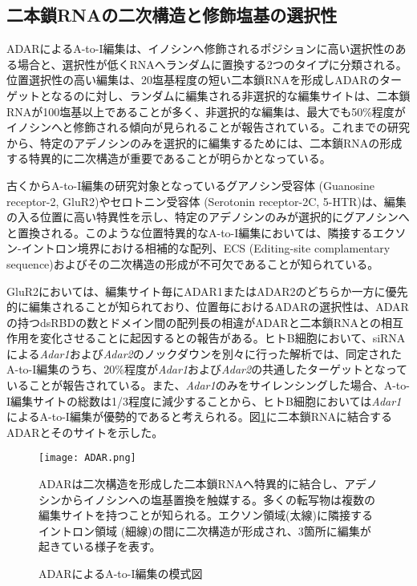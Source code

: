 \subsection{二本鎖RNAの二次構造と修飾塩基の選択性}
ADARによるA-to-I編集は、イノシンへ修飾されるポジションに高い選択性のある場合と、選択性が低くRNAへランダムに置換する2つのタイプに分類される。位置選択性の高い編集は、20塩基程度の短い二本鎖RNAを形成しADARのターゲットとなるのに対し、ランダムに編集される非選択的な編集サイトは、二本鎖RNAが100塩基以上であることが多く、非選択的な編集は、最大でも50\%程度がイノシンへと修飾される傾向が見られることが報告されている。これまでの研究から、特定のアデノシンのみを選択的に編集するためには、二本鎖RNAの形成する特異的に二次構造が重要であることが明らかとなっている。
\par
古くからA-to-I編集の研究対象となっているグアノシン受容体 (Guanosine receptor-2, GluR2)やセロトニン受容体 (Serotonin receptor-2C, 5-HTR)は、編集の入る位置に高い特異性を示し、特定のアデノシンのみが選択的にグアノシンへと置換される。このような位置特異的なA-to-I編集においては、隣接するエクソン-イントロン境界における相補的な配列、ECS (Editing-site complamentary sequence)およびその二次構造の形成が不可欠であることが知られている。
\par
GluR2においては、編集サイト毎にADAR1またはADAR2のどちらか一方に優先的に編集されることが知られており、位置毎におけるADARの選択性は、ADARの持つdsRBDの数とドメイン間の配列長の相違がADARと二本鎖RNAとの相互作用を変化させることに起因するとの報告がある。ヒトB細胞において、siRNAによる\textit{Adar1}および\textit{Adar2}のノックダウンを別々に行った解析では、同定されたA-to-I編集のうち、20\%程度が\textit{Adar1}および\textit{Adar2}の共通したターゲットとなっていることが報告されている。また、\textit{Adar1}のみをサイレンシングした場合、A-to-I編集サイトの総数は1/3程度に減少することから、ヒトB細胞においては\textit{Adar1}によるA-to-I編集が優勢的であると考えられる。図\ref{fig:ADAR}に二本鎖RNAに結合するADARとそのサイトを示した。
\begin{figure}[!htbp]
	\begin{center}
		\texttt{[image: ADAR.png]}
	\end{center}
	\caption{ADARによるA-to-I編集の模式図}
	\begin{flushleft}
		\small{ADARは二次構造を形成した二本鎖RNAへ特異的に結合し、アデノシンからイノシンへの塩基置換を触媒する。多くの転写物は複数の編集サイトを持つことが知られる。エクソン領域(太線)に隣接するイントロン領域 (細線)の間に二次構造が形成され、3箇所に編集が起きている様子を表す。}
	\end{flushleft}
	\label{fig:ADAR}
\end{figure}

